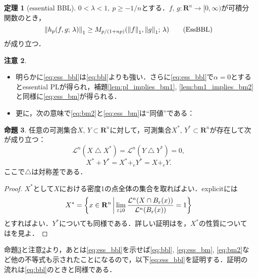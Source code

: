 \documentclass[a4j]{ltjsarticle}
\newcommand{\Rset}{\mathbf{R}}
\newcommand{\Lm}{\mathcal{L}}
\newcommand{\1}{\bm{1}}
\newcommand{\M}[4]{M_{#1}\qty(#2,#3;\,#4)}
\numberwithin{equation}{section}
\theoremstyle{definition}
\newtheorem{thm}{定理}[section]
\newtheorem{prop}[thm]{命題}
\newtheorem{rmk}[thm]{注意}
\begin{document}
\begin{thm}[essential BBL]\label{thm:ess_bbl}
    $0<\lambda<1,\ p\geq -1/n$とする．$f,\,g\colon\Rset^n\to[0,\infty)$が可積分関数のとき，
    \begin{equation}
        \norm{h_{p}(f,g;\,\lambda)}_{1}\geq \M{p/(1+np)}{\norm{f}_{1}}{\norm{g}_{1}}{\lambda}\label{eq:ess_bbl}\tag{EssBBL}
    \end{equation}
    が成り立つ．
\end{thm}
\begin{rmk}\label{rmk:ess_ineqs}
    \begin{itemize}
        \item 明らかに\eqref{eq:ess_bbl}は\eqref{eq:bbl}よりも強い．さらに\eqref{eq:ess_bbl}で$\alpha=0$とするとessential PLが得られ，補題\ref{lem:pl_implies_bm1}, \ref{lem:bm1_implies_bm2}と同様に\eqref{eq:ess_bm}が得られる．
        \item 更に，次の意味で\eqref{eq:bm2}と\eqref{eq:ess_bm}は``同値''である：
    \end{itemize}
\end{rmk}
\begin{prop}\label{prop:density1}
    任意の可測集合$X,\,Y\subset \Rset^n$に対して，可測集合$X^\ast,\,Y^\ast\subset\Rset^n$が存在して次が成り立つ：
    \begin{equation}
        \Lm^n(X\bigtriangleup X^\ast)=\Lm^n(Y\bigtriangleup Y^\ast)=0,
    \end{equation}
    \begin{equation}
        X^\ast +Y^\ast=X^\ast+_eY^\ast=X+_eY.
    \end{equation}
    ここで$\bigtriangleup$は対称差である．
\end{prop}
\begin{proof}
    $X^\ast$として$X$における密度1の点全体の集合を取ればよい．explicitには
    \begin{equation}
        X^\ast=\qty{x\in\Rset^n\,\middle|\,\lim_{\varepsilon\downarrow0}\frac{\Lm^n(X\cap B_{\varepsilon}(x))}{\Lm^n(B_{\varepsilon}(x))}=1}
    \end{equation}
    とすればよい．$Y^\ast$についても同様である．詳しい証明は\cite{BL}を，$X^\ast$の性質については\cite{EG}を見よ．
\end{proof}
命題\ref{prop:density1}と注意\ref{rmk:ess_ineqs}より，あとは\eqref{eq:ess_bbl}を示せば\eqref{eq:bbl}, \eqref{eq:ess_bm}, \eqref{eq:bm2}など他の不等式も示されたことになるので，以下\eqref{eq:ess_bbl}を証明する．証明の流れは\eqref{eq:bbl}のときと同様である．
\end{document}
